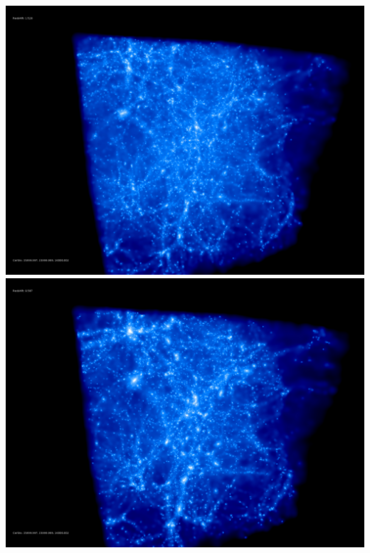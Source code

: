 \includegraphics[scale=0.1]{NGenIC_26214/50.jpg} 
\includegraphics[scale=0.1]{NGenIC_26214/100.jpg}  \\

